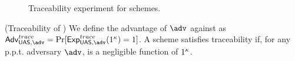 \begin{figure}[htp!]
  \caption{Traceability experiment for \UAS schemes.}
  \label{fig:exp-uas-trace}
\end{figure}

\begin{definition}{(Traceability of \UAS)}
  We define the advantage \AdvTrace of $\adv$ against \ExpTrace as
  $\AdvTrace=\Pr\lbrack\ExpTrace(1^\secpar)=1\rbrack$.
  A \UAS scheme satisfies traceability if, for any p.p.t. adversary $\adv$,
  \AdvTrace is a negligible function of $1^\kappa$.
\end{definition}

